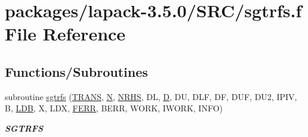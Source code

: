 \hypertarget{sgtrfs_8f}{}\section{packages/lapack-\/3.5.0/\+S\+R\+C/sgtrfs.f File Reference}
\label{sgtrfs_8f}
\subsection*{Functions/\+Subroutines}
\begin{DoxyCompactItemize}
\item 
subroutine \hyperlink{group__realGTcomputational_gaa83bbd4b0fcb6e3dffaa4ea7c08b2f08}{sgtrfs} (\hyperlink{superlu__enum__consts_8h_a0c4e17b2d5cea33f9991ccc6a6678d62a1f61e3015bfe0f0c2c3fda4c5a0cdf58}{T\+R\+A\+N\+S}, \hyperlink{polmisc_8c_a0240ac851181b84ac374872dc5434ee4}{N}, \hyperlink{example__user_8c_aa0138da002ce2a90360df2f521eb3198}{N\+R\+H\+S}, D\+L, \hyperlink{odrpack_8h_a7dae6ea403d00f3687f24a874e67d139}{D}, D\+U, D\+L\+F, D\+F, D\+U\+F, D\+U2, I\+P\+I\+V, B, \hyperlink{example__user_8c_a50e90a7104df172b5a89a06c47fcca04}{L\+D\+B}, X, L\+D\+X, \hyperlink{superlu__enum__consts_8h_af00a42ecad444bbda75cde1b64bd7e72a78fd14d7abebae04095cfbe02928f153}{F\+E\+R\+R}, B\+E\+R\+R, W\+O\+R\+K, I\+W\+O\+R\+K, I\+N\+F\+O)
\begin{DoxyCompactList}\small\item\em {\bfseries S\+G\+T\+R\+F\+S} \end{DoxyCompactList}\end{DoxyCompactItemize}
